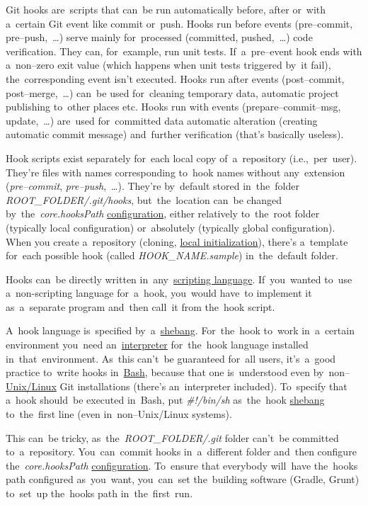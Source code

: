 Git hooks are~scripts that can~be run automatically before, after or~with a~certain Git event like commit or~push.
Hooks run before events (pre--commit, pre--push,~\dots) serve mainly for~processed (committed, pushed,~\dots) code verification.
They can, for~example, run unit tests.
If~a~pre--event hook ends with a~non--zero exit value (which happens when unit tests triggered by~it fail), the~corresponding event isn't executed.
Hooks run after events (post--commit, post--merge,~\dots) can~be used for~cleaning temporary data, automatic project publishing to~other places etc.
Hooks run with events (prepare--commit--msg, update,~\dots) are~used for~committed data automatic alteration (creating automatic commit message) and~further verification (that's basically useless).

Hook scripts exist separately for~each local copy of~a~repository (i.e.,~per~user).
They're files with names corresponding to~hook names without any~extension (\textit{pre--commit}, \textit{pre--push},~\dots).
They're by~default stored in~the~folder \textit{ROOT\_FOLDER/.git/hooks}, but~the~location can~be changed by~the~\textit{core.hooksPath} \hyperref[gitconfig]{configuration}, either relatively to~the~root folder (typically local configuration) or~absolutely (typically global configuration).
When you create a~repository (cloning, \hyperref[initrepo]{local initialization}), there's a~template for~each possible hook (called \textit{HOOK\_NAME.sample}) in~the~default folder.

Hooks can~be directly written in~any~\hyperref[scriptinglanguages]{scripting language}.
If~you~wanted to~use a~non-scripting language for~a~hook, you~would have~to implement it as~a~separate program and~then call~it from the~hook script.

A~hook language is~specified by~a~\hyperref[shebang]{shebang}.
For~the~hook to~work in~a~certain environment you~need an~\hyperref[compiledinterpretedlanguages]{interpreter} for~the~hook language installed in~that~environment.
As~this can't~be guaranteed for~all users, it's~a~good practice to~write hooks in~\hyperref[shbash]{Bash}, because that one is~understood even  by~non--\hyperref[linux]{Unix/Linux} Git installations (there's an~interpreter included).
To~specify that a~hook should~be executed in~Bash, put \textit{\#!/bin/sh} as~the~hook \hyperref[shebang]{shebang} to~the~first line (even in~non--Unix/Linux systems).

This can~be tricky, as~the~\textit{ROOT\_FOLDER/.git} folder can't~be committed to~a~repository.
You~can~commit hooks in~a~different folder and~then configure the~\textit{core.hooksPath} \hyperref[gitconfig]{configuration}.
To~ensure that everybody will~have the~hooks path configured as~you~want, you~can~set the~building software (Gradle, Grunt) to~set~up the~hooks path in~the~first~run.
